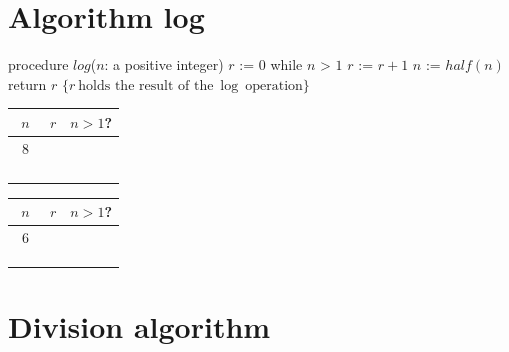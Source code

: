\documentclass[12pt, oneside]{article}
\begin{document}
\vfill \vfill
\section*{Algorithm log}


 \begin{algorithm}[caption={Algorithm for calculating integer part of $\log$}]
    procedure $\textit{log}$($n$: a positive integer)
    $r$ := $0$
    while $n$ > $1$
      $r$ := $r + 1$
      $n$ := $half(n)$
    return $r$ $\{ r~\textrm{holds the result of the}~\log~\textrm{operation}\} $
\end{algorithm}

\begin{multicols}{2}
  \begin{center}
    \begin{tabular}{c|c|c}
    $n$ & $r$  & $n > 1$?\\
    \hline 
    ~$8$~ & \phantom{~$0$~} & \phantom{~T~}\\
    \phantom{$4$} & \phantom{$1$} & \phantom{T}\\
    \phantom{$2$} & \phantom{$2$} & \phantom{T}\\
    \phantom{$1$} & \phantom{$3$} & \phantom{F}\\
    &\\
    \end{tabular}
    \end{center}
  \begin{center}
    \begin{tabular}{c|c|c}
    $n$ & $r$  & $n > 1$?\\
    \hline 
    ~$6$~ & \phantom{~$0$~} & \phantom{~T~}\\
    \phantom{$3$} & \phantom{$1$} & \phantom{T}\\
    \phantom{$1$} & \phantom{$2$} & \phantom{F}\\
    &\\
    \end{tabular}
    \end{center}
\end{multicols}

\vfill

 \vfill
\section*{Division algorithm}
\end{document}
